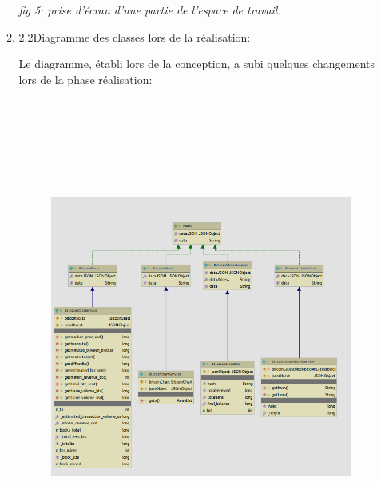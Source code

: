 \documentclass[12pt]{article}
\begin{document}
\begin{enumerate}
\begin{enumerate}
\vspace{\baselineskip}

\vspace{\baselineskip}

\vspace{\baselineskip}

\vspace{\baselineskip}

\vspace{\baselineskip}

\vspace{\baselineskip}

\vspace{\baselineskip}
\textit{fig 5: prise d’écran d’une partie de l’espace de travail.}\par

	\item 2.2\tab Diagramme des classes lors de la réalisation:\par

Le diagramme, établi lors de la conception, a subi quelques changements lors de la phase réalisation:\par


\vspace{\baselineskip}




\begin{figure}[H]
\advance\leftskip -0.07in		\includegraphics[width=6.69in,height=6.19in]{./media/image7.png}
\end{figure}





\end{enumerate}
\end{enumerate}
\end{document}
